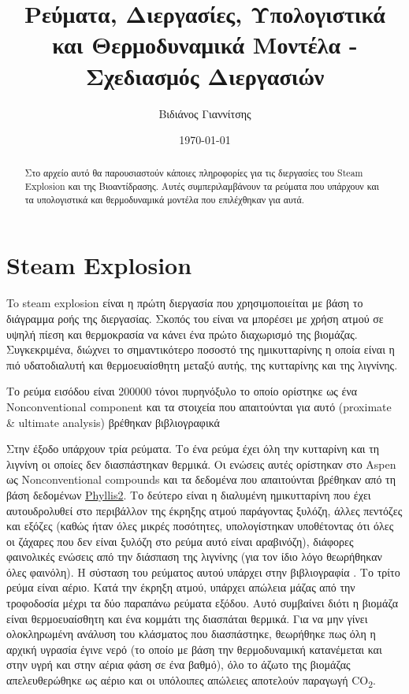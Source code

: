 \documentclass[11pt]{article}
\author{Βιδιάνος Γιαννίτσης}
\date{\today}
\title{Ρεύματα, Διεργασίες, Υπολογιστικά και Θερμοδυναμικά Μοντέλα - Σχεδιασμός Διεργασιών}
\begin{document}
\maketitle
\tableofcontents

\renewcommand{\abstractname}{Περίληψη}
\renewcommand{\tablename}{Πίνακας}
\renewcommand{\figurename}{Σχήμα}
\renewcommand\listingscaption{Κώδικας}

\begin{abstract}
Στο αρχείο αυτό θα παρουσιαστούν κάποιες πληροφορίες για τις διεργασίες του Steam Explosion και της Βιοαντίδρασης. Αυτές συμπεριλαμβάνουν τα ρεύματα που υπάρχουν και τα υπολογιστικά και θερμοδυναμικά μοντέλα που επιλέχθηκαν για αυτά.
\end{abstract}

\section{Steam Explosion}
\label{sec:org13fc8b3}
To steam explosion είναι η πρώτη διεργασία που χρησιμοποιείται με βάση το διάγραμμα ροής της διεργασίας. Σκοπός του είναι να μπορέσει με χρήση ατμού σε υψηλή πίεση και θερμοκρασία να κάνει ένα πρώτο διαχωρισμό της βιομάζας. Συγκεκριμένα, διώχνει το σημαντικότερο ποσοστό της ημικυτταρίνης η οποία είναι η πιό υδατοδιαλυτή και θερμοευαίσθητη μεταξύ αυτής, της κυτταρίνης και της λιγνίνης.

Το ρεύμα εισόδου είναι 200000 τόνοι πυρηνόξυλο το οποίο ορίστηκε ως ένα Nonconventional component και τα στοιχεία που απαιτούνται για αυτό (proximate \& ultimate analysis) βρέθηκαν βιβλιογραφικά \cite{koutsomitopoulouPreparationCharacterizationOlive2014,gonzalezCombustionOptimisationBiomass2004} 

Στην έξοδο υπάρχουν τρία ρεύματα. Το ένα ρεύμα έχει όλη την κυτταρίνη και τη λιγνίνη οι οποίες δεν διασπάστηκαν θερμικά. Οι ενώσεις αυτές ορίστηκαν στο Aspen ως Nonconventional compounds και τα δεδομένα που απαιτούνται βρέθηκαν από τη βάση δεδομένων \href{https://phyllis.nl/Browse/Standard/ECN-Phyllis\#}{Phyllis2}. Το δεύτερο είναι η διαλυμένη ημικυτταρίνη που έχει αυτουδρολυθεί στο περιβάλλον της έκρηξης ατμού παράγοντας ξυλόζη, άλλες πεντόζες και εξόζες (καθώς ήταν όλες μικρές ποσότητες, υπολογίστηκαν υποθέτοντας ότι όλες οι ζάχαρες που δεν είναι ξυλόζη στο ρεύμα αυτό είναι αραβινόζη), διάφορες φαινολικές ενώσεις από την διάσπαση της λιγνίνης (για τον ίδιο λόγο θεωρήθηκαν όλες φαινόλη). Η σύσταση του ρεύματος αυτού υπάρχει στην βιβλιογραφία \cite{fernandez-bolanosSteamexplosionOliveStones2001} . Το τρίτο ρεύμα είναι αέριο. Κατά την έκρηξη ατμού, υπάρχει απώλεια μάζας από την τροφοδοσία μέχρι τα δύο παραπάνω ρεύματα εξόδου. Αυτό συμβαίνει διότι η βιομάζα είναι θερμοευαίσθητη και ένα κομμάτι της διασπάται θερμικά. Για να μην γίνει ολοκληρωμένη ανάλυση του κλάσματος που διασπάστηκε, θεωρήθηκε πως όλη η αρχική υγρασία έγινε νερό (το οποίο με βάση την θερμοδυναμική κατανέμεται και στην υγρή και στην αέρια φάση σε ένα βαθμό), όλο το άζωτο της βιομάζας απελευθερώθηκε ως αέριο και οι υπόλοιπες απώλειες αποτελούν παραγωγή CO\textsubscript{2}.
\end{document}
